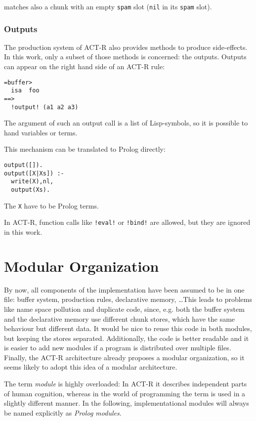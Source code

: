 matches also a chunk with an empty \lstinline|spam| slot (\lstinline|nil| in its \lstinline|spam| slot).



\subsubsection{Outputs}

The production system of ACT-R also provides methods to produce side-effects. In this work, only a subset of those methods is concerned: the outputs. Outputs can appear on the right hand side of an ACT-R rule:

\begin{lstlisting}
=buffer>
  isa  foo
==>
  !output! (a1 a2 a3)
\end{lstlisting}

The argument of such an output call is a list of Lisp-symbols, so it is possible to hand variables or terms.

This mechanism can be translated to Prolog directly:

\begin{lstlisting}
output([]).
output([X|Xs]) :-
  write(X),nl,
  output(Xs).
\end{lstlisting}

The \lstinline|X| have to be Prolog terms.

In ACT-R, function calls like \lstinline|!eval!| or \lstinline|!bind!| are allowed, but they are ignored in this work.

\section{Modular Organization}

By now, all components of the implementation have been assumed to be in one file: buffer system, production rules, declarative memory, \dots This leads to problems like name space pollution and duplicate code, since, e.g. both the buffer system and the declarative memory use different chunk stores, which have the same behaviour but different data. It would be nice to reuse this code in both modules, but keeping the stores separated. Additionally, the code is better readable and it is easier to add new modules if a program is distributed over multiple files. Finally, the ACT-R architecture already proposes a modular organization, so it seems likely to adopt this idea of a modular architecture.

The term \emph{module} is highly overloaded: In ACT-R it describes independent parts of human cognition, whereas in the world of programming the term is used in a slightly different manner. In the following, implementational modules will always be named explicitly as \emph{Prolog modules}.

